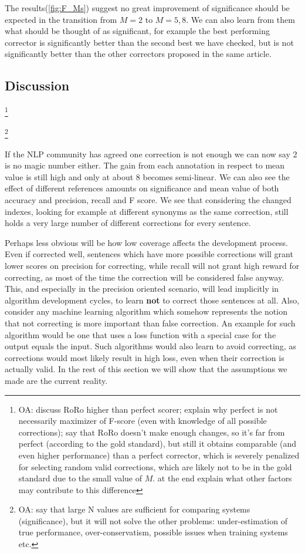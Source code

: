 \documentclass[letter,11pt]{article}
\newcommand{\oa}[1]{\footnote{\color{red}OA: #1}}
\begin{document}
The results(\ref{fig:F_Ms}) suggest no great improvement of significance should be expected in the transition from $M=2$ to $M=5,8$. We can also learn from them what should be thought of as significant, for example the best performing corrector is significantly better than the second best we have checked, but is not significantly better than the other correctors proposed in the same article\cite{rozovskaya2016grammatical}.

\subsection{Discussion}

\oa{discuss RoRo higher than perfect scorer; explain why perfect is not necessarily
  maximizer of F-score (even with knowledge of all possible corrections);
  say that RoRo doesn't make enough changes, so it's far from perfect (according
  to the gold standard), but still it obtains comparable (and even higher
  performance) than a perfect corrector, which is severely penalized for selecting
  random valid corrections, which are likely not to be in the gold standard
  due to the small value of $M$.
  at the end explain what other factors may contribute to this difference}

\oa{say that large N values are sufficient for comparing systems (significance),
  but it will not solve the other problems: under-estimation of true performance,
  over-conservatism, possible issues when training systems etc.}

If the NLP community has agreed one correction is not enough\cite{tetreault2008native}
we can now say 2 is no magic number either. The gain from each annotation in respect to mean value is still high and only at about 8 becomes semi-linear. We can also see the effect of different references amounts on significance and mean value of both accuracy and precision, recall and F score.
We see that considering the changed indexes, looking for example at different synonyms as the same correction, still holds a very large number of different corrections for every sentence.

Perhaps less obvious will be how low coverage affects the development
process. Even if corrected well, sentences which have more possible
corrections will grant lower scores on precision for correcting, while recall will not grant high reward for correcting, as most of the time the correction will be considered false anyway. This, and especially in the precision oriented scenario, will lead implicitly in algorithm development cycles, to learn \textbf{not} to correct those sentences at all. Also, consider any machine learning algorithm which somehow represents the notion that not correcting is more important than false correction. An example for such algorithm would be one that uses a loss function with a special case for the output equals the input. Such algorithms would also learn to avoid correcting, as corrections would most likely result in high loss, even when their correction is actually valid.
In the rest of this section we will show that the assumptions we made are the current reality. 
\end{document}

